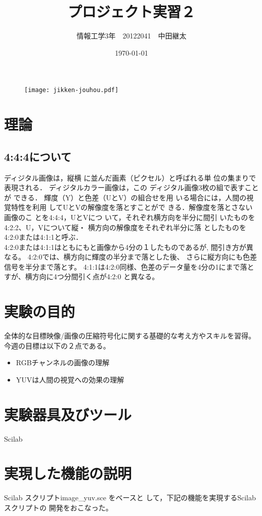 \documentclass[a4j]{jsarticle}
\title{プロジェクト実習２}
\author{情報工学3年　20122041　中田継太}
\date{\today}
\begin{document}
\thispagestyle{empty}

\begin{figure}
  \center
  \texttt{[image: jikken-jouhou.pdf]}
\end{figure}

\clearpage
\setcounter{tocdepth}{2}
\tableofcontents
\clearpage
\twocolumn

\section{理論　\cite{cite:riron1}\cite{cite:riron2}}
\subsection{4:4:4について}
ディジタル画像は，縦横
に並んだ画素（ピクセル）と呼ばれる単
位の集まりで表現される．
ディジタルカラー画像は，この
ディジタル画像3枚の組で表すことが
できる．
輝度（Y）と色差（UとV）の組合せを用
いる場合には，人間の視覚特性を利用
してUとVの解像度を落とすことがで
きる．解像度を落とさない画像のこ
とを4:4:4，UとVにつ
いて，それぞれ横方向を半分に間引
いたものを4:2:2、U，Vについて縦・
横方向の解像度をそれぞれ半分に落
としたものを4:2:0または4:1:1と呼ぶ．\\
4:2:0または4:1:1はともにもと画像から4分の１したものであるが,
間引き方が異なる。
4:2:0では、横方向に輝度の半分まで落とした後、 さらに縦方向にも色差信号を半分まで落とす。
4:1:1は4:2:0同様、色差のデータ量を4分の1にまで落とすが、横方向に4つ分間引く点が4:2:0 と異なる。

\section{実験の目的\cite{cite:object}}
全体的な目標映像/画像の圧縮符号化に関する基礎的な考え方やスキルを習得。
今週の目標は以下の２点である。
\begin{itemize}
  \item RGBチャンネルの画像の理解
  \item  YUVは人間の視覚への効果の理解
\end{itemize}

\section{実験器具及びツール}
Scilab


\section{実現した機能の説明}
Scilab スクリプトimage\_yuv.sce をベースと
して，下記の機能を実現するScilab スクリプトの
開発をおこなった。
\end{document}
